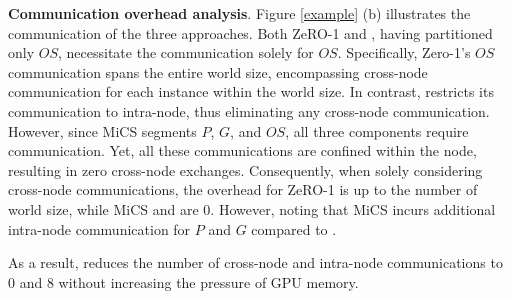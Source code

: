 

\noindent\textbf{Communication overhead analysis}. Figure \ref{example} (b) illustrates the communication of the three approaches. Both ZeRO-1 and \SysName, having partitioned only $OS$, necessitate the communication solely for $OS$. Specifically, Zero-1's $OS$ communication spans the entire world size, encompassing cross-node communication for each instance within the world size. In contrast, \SysName restricts its communication to intra-node, thus eliminating any cross-node communication. However, since MiCS segments $P$, $G$, and $OS$, all three components require communication. Yet, all these communications are confined within the node, resulting in zero cross-node exchanges. Consequently, when solely considering cross-node communications, the overhead for ZeRO-1 is up to the number of world size, while MiCS and \SysName are 0. However, noting that MiCS incurs additional intra-node communication for $P$ and $G$ compared to \SysName. 

As a result, \SysName reduces the number of cross-node and intra-node communications to 0 and 8 without increasing the pressure of GPU memory.

